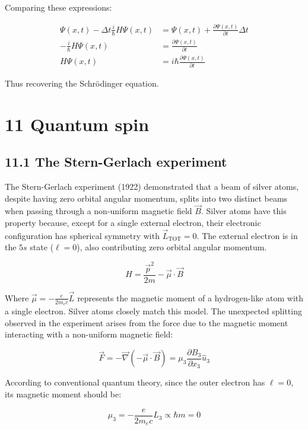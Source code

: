 \documentclass[italian]{HKNdocument}
\begin{document}
Comparing these expressions:

\begin{align*}
\Psi(x, t)-\Delta t \frac{i}{\hbar} H \Psi(x, t) & =\Psi(x, t)+\frac{\partial \Psi(x, t)}{\partial t} \Delta t \\
-\frac{i}{\hbar} H \Psi(x, t) & =\frac{\partial \Psi(x, t)}{\partial t}  \tag{10.61}\\
H \Psi(x, t) & =i \hbar \frac{\partial \Psi(x, t)}{\partial t}
\end{align*}

Thus recovering the Schrödinger equation.

\section*{11 Quantum spin}
\subsection*{11.1 The Stern-Gerlach experiment}
The Stern-Gerlach experiment (1922) demonstrated that a beam of silver atoms, despite having zero orbital angular momentum, splits into two distinct beams when passing through a non-uniform magnetic field $\vec{B}$. Silver atoms have this property because, except for a single external electron, their electronic configuration has spherical symmetry with $\vec{L}_{\text{TOT}}=0$. The external electron is in the $5s$ state ($\ell=0$), also contributing zero orbital angular momentum.


\begin{equation*}
H=\frac{\vec{p}^{2}}{2 m}-\vec{\mu} \cdot \vec{B} \tag{11.1}
\end{equation*}

Where $\vec{\mu}=-\frac{e}{2 m_{e} c} \vec{L}$ represents the magnetic moment of a hydrogen-like atom with a single electron. Silver atoms closely match this model. The unexpected splitting observed in the experiment arises from the force due to the magnetic moment interacting with a non-uniform magnetic field:

\begin{equation*}
\vec{F}=-\vec{\nabla}(-\vec{\mu} \cdot \vec{B})=\mu_{3} \frac{\partial B_{3}}{\partial x_{3}} \hat{u}_{3} \tag{11.2}
\end{equation*}

According to conventional quantum theory, since the outer electron has $\ell=0$, its magnetic moment should be:

\begin{equation*}
\mu_{3}=-\frac{e}{2 m_{e} c} L_{3} \propto \hbar m=0 \tag{11.3}
\end{equation*}
\end{document}
